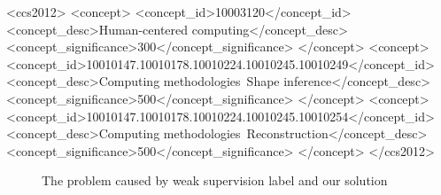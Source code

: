 \documentclass[sigconf]{acmart}
\begin{document}
\begin{CCSXML}
	<ccs2012>
	<concept>
	<concept_id>10003120</concept_id>
	<concept_desc>Human-centered computing</concept_desc>
	<concept_significance>300</concept_significance>
	</concept>
	<concept>
	<concept_id>10010147.10010178.10010224.10010245.10010249</concept_id>
	<concept_desc>Computing methodologies~Shape inference</concept_desc>
	<concept_significance>500</concept_significance>
	</concept>
	<concept>
	<concept_id>10010147.10010178.10010224.10010245.10010254</concept_id>
	<concept_desc>Computing methodologies~Reconstruction</concept_desc>
	<concept_significance>500</concept_significance>
	</concept>
	</ccs2012>
\end{CCSXML}








\maketitle



\begin{figure}
	\centering
	\caption{The problem caused by weak supervision label and our solution}
	\label{fig:fig_compare}
\end{figure}
\end{document}
